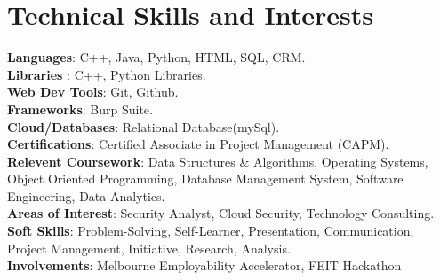 \documentclass[a4paper,11pt]{article}
\begin{document}
\section{\textbf{Technical Skills and Interests}}
 \begin{itemize}[leftmargin=0.05in, label={}]
    \small{\item{
     \textbf{Languages}{: C++, Java, Python, HTML, SQL, CRM.} \\
     \textbf{Libraries }{: C++, Python Libraries. }\\ 
     \textbf{Web Dev Tools}{: Git, Github. } \\ 
     \textbf{Frameworks}{: Burp Suite.} \\
     \textbf{Cloud/Databases}{: Relational Database(mySql). } \\  
     \textbf{Certifications}{: Certified Associate in Project Management (CAPM).}\\
     \textbf{Relevent Coursework}{: Data Structures \& Algorithms, Operating Systems, Object Oriented Programming, Database Management System, Software Engineering, Data Analytics. } \\ 
     \textbf{Areas of Interest}{: Security Analyst, Cloud Security, Technology Consulting.} \\
     \textbf{Soft Skills}{: Problem-Solving, Self-Learner, Presentation, Communication, Project Management, Initiative, Research, Analysis. } \\
     \textbf{Involvements}{: Melbourne Employability Accelerator, FEIT Hackathon }\\
    }}
 \end{itemize}
 \vspace{-16pt}



\end{document}
